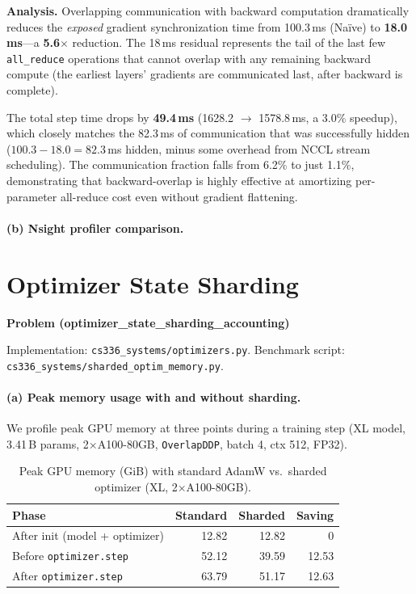 \documentclass[11pt]{article}
\begin{document}
\textbf{Analysis.}
Overlapping communication with backward computation dramatically reduces the
\emph{exposed} gradient synchronization time from 100.3\,ms (Na\"ive) to
\textbf{18.0\,ms}---a \textbf{5.6$\times$} reduction.  The 18\,ms residual
represents the tail of the last few \texttt{all\_reduce} operations that
cannot overlap with any remaining backward compute (the earliest layers'
gradients are communicated last, after backward is complete).

The total step time drops by \textbf{49.4\,ms} (1628.2 $\to$ 1578.8\,ms,
a 3.0\% speedup), which closely matches the 82.3\,ms of communication that
was successfully hidden ($100.3 - 18.0 = 82.3$\,ms hidden, minus some
overhead from NCCL stream scheduling).  The communication fraction falls from
6.2\% to just 1.1\%, demonstrating that backward-overlap is highly effective
at amortizing per-parameter all-reduce cost even without gradient flattening.

\paragraph{(b) Nsight profiler comparison.}



\section{Optimizer State Sharding}

\textbf{Problem (optimizer\_state\_sharding\_accounting)}

Implementation: \texttt{cs336\_systems/optimizers.py}.
Benchmark script: \texttt{cs336\_systems/sharded\_optim\_memory.py}.

\paragraph{(a) Peak memory usage with and without sharding.}

We profile peak GPU memory at three points during a training step
(XL model, 3.41\,B params, 2$\times$A100-80GB, \texttt{OverlapDDP},
batch 4, ctx 512, FP32).

\begin{table}[H]
\centering
\caption{Peak GPU memory (GiB) with standard AdamW vs.\ sharded optimizer
  (XL, 2$\times$A100-80GB).}
\label{tab:sharded-mem}
\begin{tabular}{l rr r}
\toprule
Phase & Standard & Sharded & Saving \\
\midrule
After init (model + optimizer) & 12.82 & 12.82 & 0 \\
Before \texttt{optimizer.step} & 52.12 & 39.59 & 12.53 \\
After \texttt{optimizer.step}  & 63.79 & 51.17 & 12.63 \\
\bottomrule
\end{tabular}
\end{table}
\end{document}
